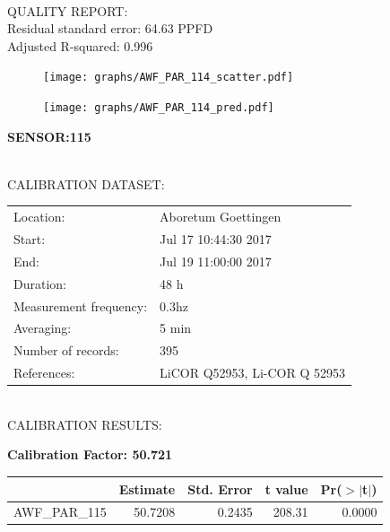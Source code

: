 \documentclass[oneside]{report}
\begin{document}
\hrulefill\\
QUALITY REPORT:\\
Residual standard error: 64.63 PPFD\\
Adjusted R-squared: 0.996



\begin{figure}[H]
  \centering
  \texttt{[image: graphs/AWF\_PAR\_114\_scatter.pdf]}
\end{figure}




\begin{figure}[H]
  \centering
  \texttt{[image: graphs/AWF\_PAR\_114\_pred.pdf]}
\end{figure}

\pagebreak


\begin{center}
\large{\textbf{SENSOR:115}}\\
\end{center}

\hrulefill\\
CALIBRATION DATASET:\\
\begin{table}[h!]
  \centering
  \label{tab:table1}
  \begin{tabular}{ll}
    Location: & Aboretum Goettingen\\ 
    
    
    Start:  & Jul 17 10:44:30 2017 \\
    End:   & Jul 19 11:00:00 2017\\ 
    Duration: & 48 h\\
    Measurement frequency: & 0.3hz\\
    Averaging:  &5 min\\
    Number of records: & 395 \\
    References: & LiCOR Q52953, Li-COR Q 52953 \\
  \end{tabular}
\end{table}

\hrulefill\\
CALIBRATION RESULTS:\\


\begin{center}
\textbf{\large{Calibration Factor: 50.721}}\\
\end{center}
\begin{table}[ht]
\centering
\begin{tabular}{rrrrr}
  \hline
 & Estimate & Std. Error & t value & Pr($>$$|$t$|$) \\ 
  \hline
AWF\_PAR\_115 & 50.7208 & 0.2435 & 208.31 & 0.0000 \\ 
   \hline
\end{tabular}
\end{table}
\end{document}
